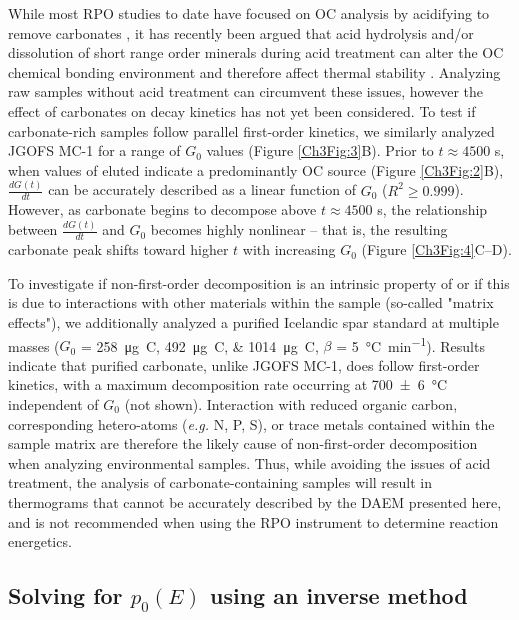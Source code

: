 While most RPO studies to date have focused on OC analysis by acidifying to remove carbonates \citep[\textit{e.g.}][]{Rosenheim:2008ed,Rosenheim:2012kh,Rosenheim:2013dka,Schreiner:2014jr,Bianchi:2015jr}, it has recently been argued that acid hydrolysis and/or dissolution of short range order minerals during acid treatment can alter the OC chemical bonding environment and therefore affect thermal stability \citep{Plante:2013tu}. Analyzing raw samples without acid treatment can circumvent these issues, however the effect of carbonates on decay kinetics has not yet been considered. To test if carbonate-rich samples follow parallel first-order kinetics, we similarly analyzed JGOFS MC-1 for a range of $G_{0}$ values (Figure \ref{Ch3Fig:3}B). Prior to $t \approx 4500$ s, when  values of eluted  indicate a predominantly OC source (Figure \ref{Ch3Fig:2}B), $\frac{dG(t)}{dt}$ can be accurately described as a linear function of $G_{0}$ ($R^{2} \geq 0.999$). However, as carbonate begins to decompose above $t \approx 4500$ s, the relationship between $\frac{dG(t)}{dt}$ and $G_{0}$ becomes highly nonlinear -- that is, the resulting carbonate peak shifts toward higher $t$ with increasing $G_{0}$ (Figure \ref{Ch3Fig:4}C--D). 

To investigate if non-first-order decomposition is an intrinsic property of  or if this is due to interactions with other materials within the sample (so-called "matrix effects"), we additionally analyzed a purified Icelandic spar  standard at multiple masses ($G_{0}$ = \SIlist{258;492;1014}{\micro g.C}, $\beta$ = \SI{5}{\celsius.min^{-1}}). Results indicate that purified carbonate, unlike JGOFS MC-1, does follow first-order kinetics, with a maximum decomposition rate occurring at \SI{700 \pm 6}{\celsius} independent of $G_{0}$ (not shown). Interaction with reduced organic carbon, corresponding hetero-atoms (\textit{e.g.} N, P, S), or trace metals contained within the sample matrix are therefore the likely cause of non-first-order  decomposition when analyzing environmental samples. Thus, while avoiding the issues of acid treatment, the analysis of carbonate-containing samples will result in thermograms that cannot be accurately described by the DAEM presented here, and is not recommended when using the RPO instrument to determine reaction energetics.


\subsection{Solving for $p_{0}(E)$ using an inverse method}

